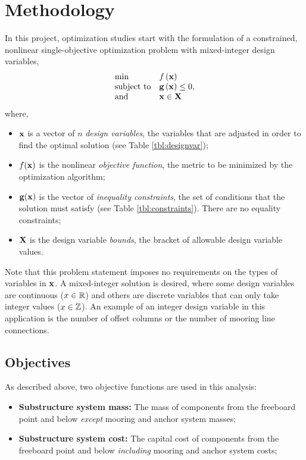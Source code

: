 \section{Methodology}
In this project, optimization studies start with the formulation of
a constrained, nonlinear single-objective optimization problem with
mixed-integer design variables,
\begin{equation}
\begin{array}{ll}
  \min & f\left(\mathbf{x}\right)\\
  \text{subject to} & \mathbf{g}\left(\mathbf{x}\right) \leq 0,\\
  \text{and}& \mathbf{x} \in \mathbf{X} \\
  \end{array}
\end{equation}
where,
\begin{itemize}
\item $\mathbf{x}$ is a vector of $n$ \textit{design variables}, the variables that are adjusted in order to
  find the optimal solution (see Table \ref{tbl:designvar});
\item $f(\mathbf{x})$ is the nonlinear \textit{objective function}, the
  metric to be minimized by the optimization algorithm;
\item $\mathbf{g} (\mathbf{x})$ is the vector of \textit{inequality constraints}, the
  set of conditions that the solution must satisfy (see Table
  \ref{tbl:constraints}).  There are no equality constraints;
\item $\mathbf{X}$ is the design variable \textit{bounds}, the bracket of
  allowable design variable values.
\end{itemize}

Note that this problem statement imposes no requirements on the types of
variables in $\mathbf{x}$.  A mixed-integer solution is desired, where some
design variables are continuous ($x \in \mathbb{R}$) and others are
discrete variables that can only take integer values ($x \in
\mathbb{Z}$).  An example of an integer design variable in this
application is the number of offset columns or the number of mooring
line connections.


\subsection{Objectives}
As described above, two objective functions are used in this analysis:
\begin{itemize}
\item \textbf{Substructure system mass:} The mass of components from the
  freeboard point and below \textit{except} mooring and anchor system masses;
\item \textbf{Substructure system cost:} The capital cost of components from the
  freeboard point and below \textit{including} mooring and anchor system costs;
\end{itemize}



